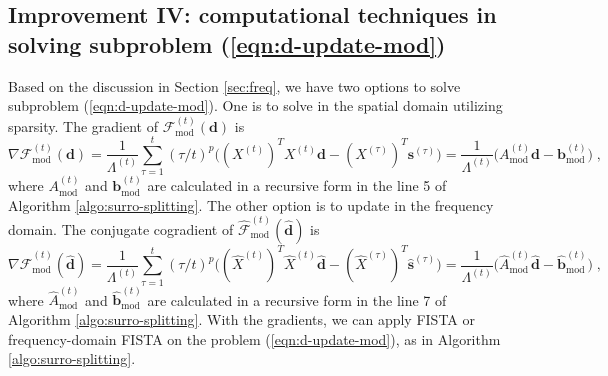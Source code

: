 \documentclass[final]{siamart1116}
\newcommand{\mb}[1]{\mathbf{#1}}
\def \F  {\mathcal{F}}
\begin{document}
\subsection{Improvement IV: computational techniques in solving subproblem (\ref{eqn:d-update-mod})}
\label{para:freq}

 Based on the discussion in Section \ref{sec:freq}, we have two options to solve subproblem (\ref{eqn:d-update-mod}). One is to solve in the spatial domain utilizing sparsity. The gradient of $\F^{(t)}_{\mathrm{mod}}(\mb{d}) $ is
\[
\nabla \F^{(t)}_{\mathrm{mod}}(\mb{d}) = \frac{1}{\Lambda^{(t)}} \sum_{\tau=1}^t  (\tau/t)^p \Big((X^{(t)})^T X^{(t)} \mb{d} - (X^{(\tau)})^T \mb{s}^{(\tau)}\Big) =  \frac{1}{\Lambda^{(t)}} \Big(A^{(t)}_{\mathrm{mod}} \mb{d} - \mb{b}^{(t)}_{\mathrm{mod}}\Big) \;,
\]
where $A^{(t)}_{\mathrm{mod}}$ and $\mb{b}^{(t)}_{\mathrm{mod}}$ are calculated in a recursive form in the line 5 of Algorithm \ref{algo:surro-splitting}. The other option is to update in the frequency domain. The conjugate cogradient of $\hat{\F}^{(t)}_{\mathrm{mod}}(\hat{\mb{d}}) $ is
\[
\nabla \hat{\F}^{(t)}_{\mathrm{mod}}(\hat{\mb{d}}) = \frac{1}{\Lambda^{(t)}} \sum_{\tau=1}^t  (\tau/t)^p \Big((\hat{X}^{(t)})^T \hat{X}^{(t)} \hat{\mb{d}} - (\hat{X}^{(\tau)})^T \hat{\mb{s}}^{(\tau)}\Big) =  \frac{1}{\Lambda^{(t)}} \Big(\hat{A}^{(t)}_{\mathrm{mod}} \hat{\mb{d}} - \hat{\mb{b}}^{(t)}_{\mathrm{mod}}\Big) \;,
\]
where $\hat{A}^{(t)}_{\mathrm{mod}}$ and $\hat{\mb{b}}^{(t)}_{\mathrm{mod}}$ are calculated in a recursive form in the line 7 of Algorithm \ref{algo:surro-splitting}.
With the gradients, we can apply FISTA or frequency-domain FISTA on the problem (\ref{eqn:d-update-mod}), as in Algorithm \ref{algo:surro-splitting}.
\end{document}
